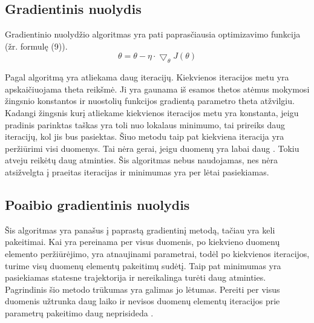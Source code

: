 \documentclass{VUMIFInfKursinis}
\begin{document}
\subsection{Gradientinis nuolydis}
Gradientinio nuolydžio algoritmas
yra pati paprasčiausia optimizavimo funkcija  (žr. formulę (9)).
\begin{equation}
\theta = \theta - \eta \cdot \bigtriangledown_{\theta}J(\theta)
\end{equation}
\par
Pagal algoritmą yra atliekama daug iteracijų. Kiekvienos iteracijos metu yra
apskaičiuojama theta reikšmė. Ji yra gaunama iš esamos thetos atėmus mokymosi žingsnio konstantos
ir nuostolių funkcijos gradientą parametro theta atžvilgiu. Kadangi žingsnis kurį
atliekame kiekvienos iteracijos metu yra konstanta, jeigu pradinis parinktas taškas
yra toli nuo lokalaus minimumo, tai prireiks daug iteracijų, kol jis bus pasiektas.
Šiuo metodu taip pat kiekviena iteracija yra peržiūrimi visi duomenys. Tai nėra 
gerai, jeigu duomenų yra labai daug \cite{salt8}. Tokiu atveju reikėtų daug atminties. Šis algoritmas nebus naudojamas, nes nėra
atsižvelgta į praeitas iteracijas ir minimumas yra per lėtai pasiekiamas.

\subsection{Poaibio gradientinis nuolydis}
 Šis algoritmas yra panašus į paprastą gradientinį metodą, tačiau yra keli pakeitimai.
 Kai yra pereinama per visus duomenis, po kiekvieno duomenų elemento peržiūrėjimo,
 yra atnaujinami parametrai, todėl po kiekvienos iteracijos, turime visų duomenų
 elementų pakeitimų sudėtį. Taip pat minimumas yra pasiekiamas statesne trajektorija ir
 nereikalinga turėti daug atminties. Pagrindinis šio metodo trūkumas yra galimas jo
 lėtumas. Pereiti per visus duomenis užtrunka daug laiko ir nevisos duomenų elementų
 iteracijos prie parametrų pakeitimo daug neprisideda \cite{salt9}.
\end{document}
